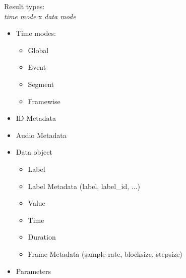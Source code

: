 \documentclass[10pt, final, hyperref, table]{beamer}
\begin{document}
\begin{frame}
\begin{minipage}{0.4\linewidth}
\begin{block}{Result types: \\\emph{time mode} x \emph{data mode}}
\begin{itemize}
      \item Time modes:
        \begin{itemize}
        \item \alert<2,6>{Global}
        \item \alert<3,7>{Event}
        \item \alert<4,8>{Segment}
        \item \alert<5,9>{Framewise}
        \end{itemize}
      \end{itemize}
  \end{block}
    \end{minipage}
    \begin{minipage}{0.55\linewidth}
      \begin{itemize}
      \item ID Metadata
      \item Audio Metadata
      \item Data object
        \begin{itemize}
        \item<2-5> Label
        \item<2-5> Label Metadata (label, label\_id, ...)
        \item<6-9> Value
        \item<3-4,7-8> Time
        \item<4,8> Duration
        \item<5,9> Frame Metadata (sample rate, blocksize, stepsize)
        \end{itemize}
      \item Parameters
      \end{itemize}
    \end{minipage}

    


\end{frame}
\end{document}
